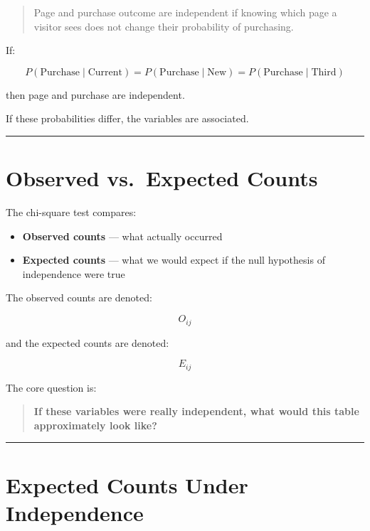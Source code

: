 \documentclass[
  letterpaper,
  DIV=11,
  numbers=noendperiod]{scrreprt}
\providecommand{\tightlist}{%
  \setlength{\itemsep}{0pt}\setlength{\parskip}{0pt}}
\begin{document}
\begin{quote}
Page and purchase outcome are independent if knowing which page a
visitor sees does not change their probability of purchasing.
\end{quote}

If:

\[
P(\text{Purchase}\mid\text{Current})
=
P(\text{Purchase}\mid\text{New})
=
P(\text{Purchase}\mid\text{Third})
\]

then page and purchase are independent.

If these probabilities differ, the variables are associated.

\begin{center}\rule{0.5\linewidth}{0.5pt}\end{center}


\chapter{Observed vs.~Expected
Counts}\label{observed-vs.-expected-counts}

The chi-square test compares:

\begin{itemize}
\tightlist
\item
  \textbf{Observed counts} --- what actually occurred
\item
  \textbf{Expected counts} --- what we would expect if the null
  hypothesis of independence were true
\end{itemize}

The observed counts are denoted:

\[
O_{ij}
\]

and the expected counts are denoted:

\[
E_{ij}
\]

The core question is:

\begin{quote}
\textbf{If these variables were really independent, what would this
table approximately look like?}
\end{quote}

\begin{center}\rule{0.5\linewidth}{0.5pt}\end{center}


\chapter{Expected Counts Under
Independence}\label{expected-counts-under-independence}
\end{document}
